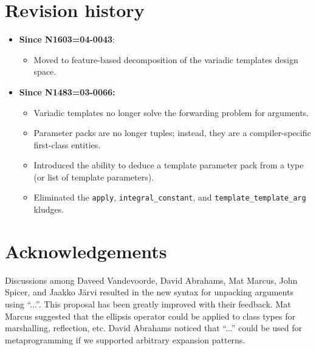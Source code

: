\documentclass{article}
\begin{document}
\section{Revision history}
\begin{itemize}

\item \textbf{Since N1603=04-0043}:
  \begin{itemize}
  \item Moved to feature-based decomposition of the variadic templates
    design space.
  \end{itemize}

\item \textbf{Since N1483=03-0066:} 
  \begin{itemize}
  \item Variadic templates no longer solve the forwarding problem for
    arguments. 
  \item Parameter packs are no longer tuples; instead, they are a
    compiler-specific first-class entities.
  \item Introduced the ability to deduce a template parameter pack
    from a type (or list of template parameters).
  \item Eliminated the \texttt{apply}, \texttt{integral\_constant},
    and \texttt{template\_template\_arg} kludges.
  \end{itemize}
\end{itemize}

\section{Acknowledgements}
Discussions among Daveed Vandevoorde, David Abrahams, Mat Marcus, John
Spicer, and Jaakko J\"arvi resulted in the new syntax for unpacking
arguments using ``...''. This proposal has been greatly improved with
their feedback. Mat Marcus suggested that the ellipsis operator could
be applied to class types for marshalling, reflection, etc. David
Abrahams noticed that ``...''  could be used for metaprogramming if we
supported arbitrary expansion patterns.



\end{document}
